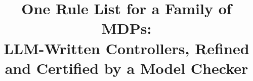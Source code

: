 \documentclass[conference]{IEEEtran}
\begin{document}
\title{One Rule List for a Family of MDPs:\\LLM-Written Controllers, Refined and Certified by a Model Checker}

\author{}

\maketitle

\begin{abstract}

\end{abstract}












\end{document}
